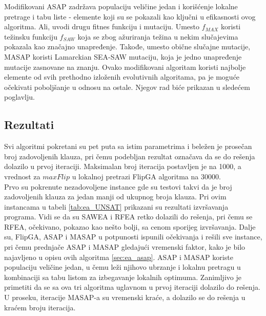 \documentclass[a4paper]{article}
\begin{document}
Modifikovani ASAP zadržava populaciju veličine jedan i korišćenje lokalne pretrage i tabu
liste - elemente koji su se pokazali kao ključni u efikasnosti ovog algoritma.
Ali, uvodi drugu fitnes funkciju i mutaciju. Umesto $f_{MAX}$ koristi težinsku funkciju
$f_{SAW}$ koja se zbog ažuriranja težina u nekim slučajevima pokazala kao značajno
unapređenje. Takođe, umesto obične slučajne mutacije, MASAP koristi Lamarckian SEA-SAW
mutaciju, koja je jedno unapređenje mutacije zasnovane na znanju.
Ovako modifikovani algoritam koristi najbolje elemente od svih prethodno izloženih 
evolutivnih algoritama, pa je moguće očekivati poboljšanje u odnosu na ostale. Njegov
rad biće prikazan u sledećem poglavlju.


\subsection{Rezultati}
\label{sec:ea_rezultati}
Svi algoritmi pokretani su pet puta sa istim parametrima i beležen je prosečan broj
zadovoljenih klauza, pri čemu podebljan rezultat označava da se do rešenja 
dolazilo u prvoj iteraciji. Maksimalan broj iteracija postavljen je na 1000, a vrednost
za $maxFlip$ u lokalnoj pretrazi FlipGA algoritma na 30000.\\

Prvo su pokrenute nezadovoljene instance gde su testovi takvi da je broj zadovoljenih klauza
za jedan manji od ukupnog broja klauza. Pri ovim instancama u tabeli \ref{tab:ea_UNSAT}
prikazani su rezultati izvršavanja programa. Vidi se da su SAWEA i RFEA retko dolazili
do rešenja, pri čemu se RFEA, očekivano, pokazao kao nešto bolji, sa cenom sporijeg
izvršavanja. Dalje su, FlipGA, ASAP i MASAP u potpunosti ispunili očekivanja i rešili sve
instance, pri čemu prednjače ASAP i MASAP gledajući vremenski faktor, 
kako je bilo najavljeno u opisu ovih  algoritma \ref{sec:ea_asap}. 
ASAP i MASAP koriste populaciju veličine jedan, u čemu leži njihovo
ubrzanje i lokalnu pretragu u kombinaciji sa tabu listom za izbegavanje lokalnih optimuma.
Zanimljivo je primetiti da se sa ova tri algoritma uglavnom u prvoj iteraciji dolazilo do 
rešenja. U proseku, iteracije MASAP-a su vremenski kraće, a dolazilo se do rešenja u 
kraćem broju iteracija.
\end{document}

